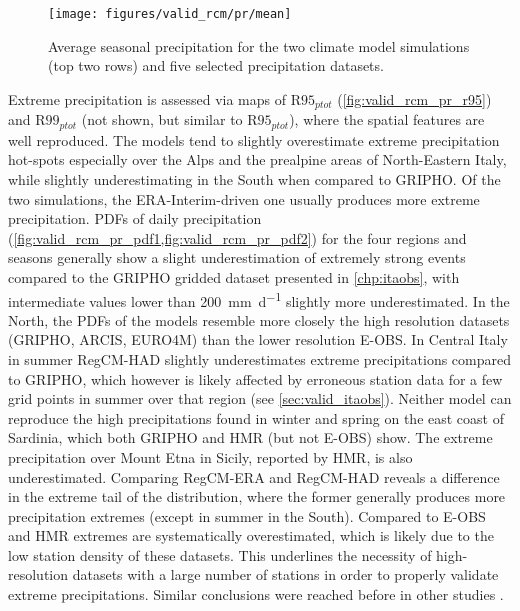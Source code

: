\begin{figure}
    \centering
    \texttt{[image: figures/valid\_rcm/pr/mean]}
    \decoRule
    \caption[Validation of average seasonal precipitation]{
        Average seasonal precipitation for the two climate model simulations (top two rows) and five selected precipitation datasets.
    } \label{fig:valid_rcm_pr_mean}
\end{figure}
Extreme precipitation is assessed via maps of $\textrm{R95}_{ptot}$ (\cref{fig:valid_rcm_pr_r95}) and $\textrm{R99}_{ptot}$ (not shown, but similar to $\textrm{R95}_{ptot}$), where the spatial features are well reproduced.
The models tend to slightly overestimate extreme precipitation hot-spots especially over the Alps and the prealpine areas of North-Eastern Italy, while slightly underestimating in the South when compared to GRIPHO.
Of the two simulations, the ERA-Interim-driven one usually produces more extreme precipitation.
PDFs of daily precipitation (\cref{fig:valid_rcm_pr_pdf1,fig:valid_rcm_pr_pdf2}) for the four regions and seasons generally show a slight underestimation of extremely strong events compared to the GRIPHO gridded dataset presented in \cref{chp:itaobs}, with intermediate values lower than \SI{200}{\milli\metre\per\day} slightly more underestimated.
In the North, the PDFs of the models resemble more closely the high resolution datasets (GRIPHO, ARCIS, EURO4M) than the lower resolution E-OBS.
In Central Italy in summer RegCM-HAD slightly underestimates extreme precipitations compared to GRIPHO, which however is likely affected by erroneous station data for a few grid points in summer over that region (see \cref{sec:valid_itaobs}).
Neither model can reproduce the high precipitations found in winter and spring on the east coast of Sardinia, which both GRIPHO and HMR (but not E-OBS) show.
The extreme precipitation over Mount Etna in Sicily, reported by HMR, is also underestimated.
Comparing RegCM-ERA and RegCM-HAD reveals a difference in the extreme tail of the distribution, where the former generally produces more precipitation extremes (except in summer in the South).
Compared to E-OBS and HMR extremes are systematically overestimated, which is likely due to the low station density of these datasets.
This underlines the necessity of high-resolution datasets with a large number of stations in order to properly validate extreme precipitations.
Similar conclusions were reached before in other studies \citep{Fantini2016,Prein2016,Prein2017}.
